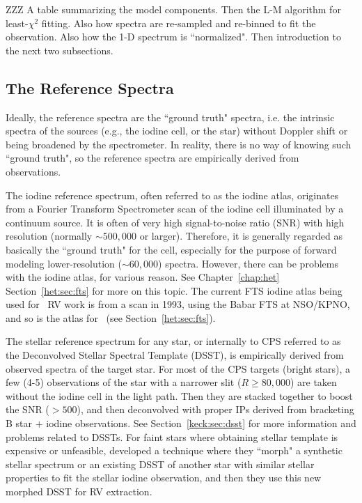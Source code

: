 ZZZ A table summarizing the model components. Then the L-M algorithm
for least-$\chi^2$ fitting. Also how spectra are re-sampled and
re-binned to fit the observation. Also how the 1-D spectrum is
``normalized". Then introduction to the next two subsections.


\subsection{The Reference Spectra}

Ideally, the reference spectra are the ``ground truth" spectra,
i.e. the intrinsic spectra of the sources (e.g., the iodine cell, or
the star) without Doppler shift or being broadened by the
spectrometer. In reality, there is no way of knowing such ``ground
truth", so the reference spectra are empirically derived from
observations.

The iodine reference spectrum, often referred to as the iodine atlas,
originates from a Fourier Transform Spectrometer scan of the iodine
cell illuminated by a continuum source. It is often of very high
signal-to-noise ratio (SNR) with high resolution (normally $\sim
500,000$ or larger). Therefore, it is generally regarded as basically
the ``ground truth" for the cell, especially for the purpose of
forward modeling lower-resolution ($\sim 60,000$) spectra. However,
there can be problems with the iodine atlas, for various reason. See
Chapter~\ref{chap:het} Section~\ref{het:sec:fts} for more on this
topic. The current FTS iodine atlas being used for \keck\ RV work is
from a scan in 1993, using the Babar FTS at NSO/KPNO, and so is the
atlas for \het\ (see Section~\ref{het:sec:fts}).

The stellar reference spectrum for any star, or internally to CPS
referred to as the Deconvolved Stellar Spectral Template (DSST), is
empirically derived from observed spectra of the target star. For most
of the CPS targets (bright stars), a few (4-5) observations of the
star with a narrower slit ($R \geq 80,000$) are taken without the
iodine cell in the light path. Then they are stacked together to boost
the SNR ($>500$), and then deconvolved with proper IPs derived from
bracketing B star $+$ iodine observations. See
Section~\ref{keck:sec:dsst} for more information and problems related
to DSSTs. For faint stars where obtaining stellar template is
expensive or unfeasible, \cite{2006ApJ...647..600J} developed a
technique where they ``morph" a synthetic stellar spectrum or an
existing DSST of another star with similar stellar properties to fit
the stellar iodine observation, and then they use this new morphed
DSST for RV extraction.



